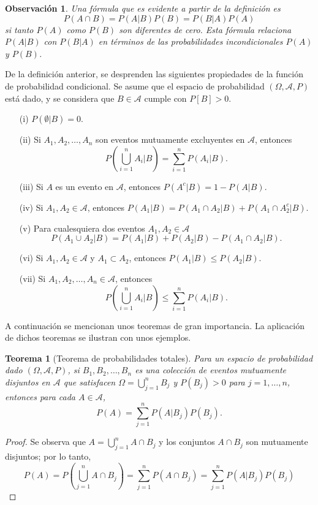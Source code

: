 \documentclass[12pt]{article}
\newtheorem{theorem}{Teorema}[section]
\newtheorem*{remark}{Observación}
\begin{document}
\begin{remark}
    Una fórmula que es evidente a partir de la definición es $$P(A\cap B)= P(A|B)P(B)=P(B|A)P(A)$$ si tanto $P(A)$ como $P(B)$ son diferentes de cero. Esta fórmula relaciona $P(A|B)$ con $P(B|A)$ en términos de las probabilidades incondicionales $P(A)$ y $P(B)$.
\end{remark}
De la definición anterior, se desprenden las siguientes propiedades de la función de probabilidad condicional. Se asume que el espacio de probabilidad $(\Omega, \mathscr A, P)$ está dado, y se considera que $B\in\mathscr A$ cumple con $P[B]>0$.
\begin{itemize}
    \item[(i)] $P(\emptyset| B)=0$.
    \item[(ii)] Si $A_1, A_2, \ldots, A_n$ son eventos mutuamente excluyentes en $\mathscr A$, entonces
    $$P\left(\bigcup_{i=1}^n A_i|B\right)= \sum_{i=1}^n P(A_i|B).$$
    \item[(iii)] Si $A$ es un evento en $\mathscr A$, entonces  $P(A^c| B)=1-P(A|B)$.
    \item[(iv)] Si $A_1, A_2\in \mathscr A$, entonces $P(A_1|B)=P(A_1\cap A_2|B)+ P(A_1\cap A_2^c|B)$.
    \item[(v)] Para cualesquiera dos eventos $A_1,A_2\in \mathscr A$
    $$P(A_1\cup A_2|B)=P(A_1|B)+P(A_2|B)-P(A_1\cap A_2|B).$$
    \item[(vi)] Si $A_1, A_2\in\mathscr A$ y $A_1\subset A_2$, entonces $P(A_1|B)\leq P(A_2|B)$.
    \item[(vii)] Si $A_1, A_2,\ldots, A_n\in\mathscr A$, entonces
    $$P\left(\bigcup_{i=1}^n A_i|B\right)\leq \sum_{i=1}^n P(A_i|B).$$
\end{itemize}
A continuación se mencionan unos teoremas de gran importancia. La aplicación de dichos teoremas se ilustran con unos ejemplos.
\begin{theorem}[Teorema de probabilidades totales]
    Para un espacio de probabilidad dado $(\Omega, \mathscr A, P)$, si $B_1, B_2, \ldots, B_n$ es una colección de eventos mutuamente disjuntos en $\mathscr A$ que satisfacen $\Omega = \bigcup\limits_{j=1}^n B_j$ y $P(B_j)>0$ para $j=1,\ldots, n$, entonces para cada $A\in \mathscr A$, $$P(A)=\sum_{j=1}^n P(A|B_j)P(B_j).$$
\end{theorem}
\begin{proof} Se observa que $A=\bigcup\limits_{j=1}^n A\cap B_j$ y los conjuntos $A\cap B_j$ son mutuamente disjuntos; por lo tanto,
    $$P(A)=P\left(\bigcup_{j=1}^n A\cap B_j\right)=\sum_{j=1}^n P(A\cap B_j)= \sum_{j=1}^n P(A|B_j)P(B_j)$$
\end{proof}
\end{document}

